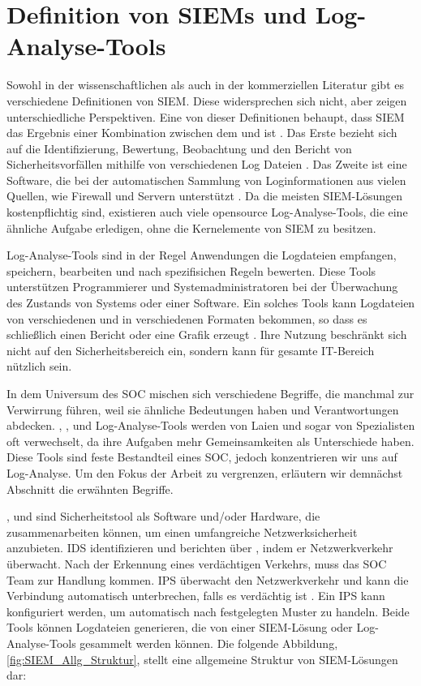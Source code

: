 \section{Definition von SIEMs und Log-Analyse-Tools}

Sowohl in der wissenschaftlichen als auch in der kommerziellen Literatur gibt es verschiedene Definitionen von \gls{SIEM}. Diese widersprechen sich nicht, aber zeigen unterschiedliche Perspektiven. Eine von dieser Definitionen behaupt, dass \gls{SIEM} das Ergebnis einer Kombination zwischen dem  und  ist \citep{Dorigo_SIEM}. Das Erste bezieht sich auf die Identifizierung, Bewertung, Beobachtung und den Bericht von Sicherheitsvorfällen mithilfe von verschiedenen Log Dateien \citep{techopedia_SEM}. Das Zweite ist eine Software, die bei der automatischen Sammlung von Loginformationen aus vielen Quellen, wie Firewall und Servern unterstützt \citep{techopedia_SIM}. Da die meisten \gls{SIEM}-Lösungen kostenpflichtig sind, existieren auch viele \gls{opensource} Log-Analyse-Tools, die eine ähnliche Aufgabe erledigen, ohne die Kernelemente von \gls{SIEM} zu besitzen. 

Log-Analyse-Tools sind in der Regel Anwendungen die Logdateien empfangen, speichern, bearbeiten und nach spezifisichen Regeln bewerten. Diese Tools unterstützen Programmierer und Systemadministratoren bei der Überwachung des Zustands von Systems oder einer Software. Ein solches Tools kann Logdateien von verschiedenen  und in verschiedenen Formaten bekommen, so dass es schließlich einen Bericht oder eine Grafik erzeugt \citep{Korzeniowski_LATDef}. Ihre Nutzung beschränkt sich nicht auf den Sicherheitsbereich ein, sondern kann für gesamte IT-Bereich nützlich sein.

In dem Universum des \gls{SOC} mischen sich verschiedene Begriffe, die manchmal zur Verwirrung führen, weil sie ähnliche Bedeutungen haben und Verantwortungen abdecken. , ,  und Log-Analyse-Tools werden von Laien und sogar von Spezialisten oft verwechselt, da ihre Aufgaben mehr Gemeinsamkeiten als Unterschiede haben. Diese Tools sind feste Bestandteil eines \gls{SOC}, jedoch konzentrieren wir uns auf Log-Analyse. Um den Fokus der Arbeit zu vergrenzen, erläutern wir demnächst Abschnitt die erwähnten Begriffe.

,  und  sind Sicherheitstool als Software und/oder Hardware, die zusammenarbeiten können, um einen umfangreiche Netzwerksicherheit anzubieten. \gls{IDS} identifizieren und berichten über , indem er Netzwerkverkehr überwacht. Nach der Erkennung eines verdächtigen Verkehrs, muss das \gls{SOC} Team zur Handlung kommen. \gls{IPS} überwacht den Netzwerkverkehr und kann die Verbindung automatisch unterbrechen, falls es verdächtig ist \citep{Wendzel_IS}. Ein \gls{IPS} kann konfiguriert werden, um automatisch nach festgelegten Muster zu handeln. Beide Tools können Logdateien generieren, die von einer \gls{SIEM}-Lösung oder Log-Analyse-Tools gesammelt werden können. Die folgende Abbildung, \ref{fig:SIEM_Allg_Struktur}, stellt eine allgemeine Struktur von \gls{SIEM}-Lösungen dar:

